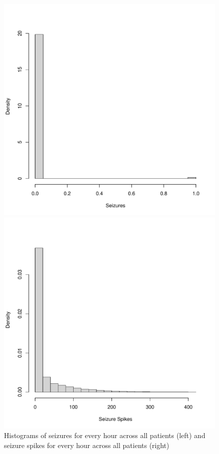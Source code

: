 \begin{figure}
  \begin{minipage}[b]{0.5\linewidth}
    \centering
     \includegraphics[width=\linewidth]{chapters/CodingBasics/figures/le_histogram.pdf}

  \end{minipage}
  \begin{minipage}[b]{0.5\linewidth}
    \centering
     \includegraphics[width=\linewidth]{chapters/CodingBasics/figures/iea_lead_agg.pdf}
  \end{minipage}
  \label{fig:seizures}
  \caption{Histograms of seizures for every hour across all patients (left) and seizure spikes for every hour across all patients (right)}
\end{figure}
